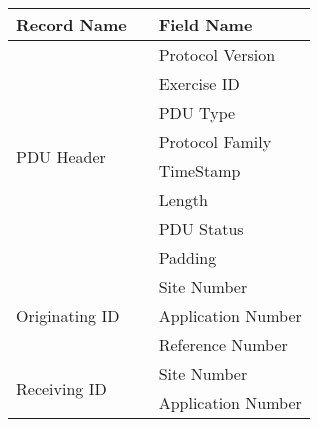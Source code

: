 \documentclass[12pt]{article}
\begin{document}
\begin{table}
  \centering
  \begin{tabular}{l|l|l }
    \hline
    Record Name                      &                                              & Field Name                       \\ \hline \hline
    \multirow{8}{*}{PDU Header}      &                                              & Protocol Version                 \\
                                     &                                              & Exercise ID                      \\
                                     &                                              & PDU Type                         \\
                                     &                                              & Protocol Family                  \\
                                     &                                              & TimeStamp                        \\
                                     &                                              & Length                           \\                    
                                     &                                              & PDU Status                       \\                 
                                     &                                              & Padding                          \\ \hline
    \multirow{3}{*}{Originating ID}  &                                              & Site Number                      \\
                                     &                                              & Application Number               \\
                                     &                                              & Reference Number                 \\ \hline
    \multirow{3}{*}{Receiving ID}    &                                              & Site Number                      \\
                                     &                                              & Application Number               \\

\end{tabular}
\end{table}
\end{document}
